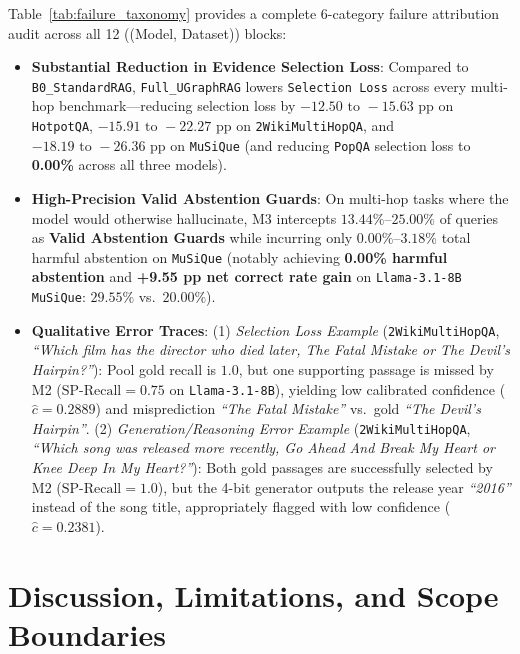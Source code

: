 \documentclass[11pt]{article}
\begin{document}
Table~\ref{tab:failure_taxonomy} provides a complete 6-category failure attribution audit across all 12 ((Model, Dataset)) blocks:
\begin{itemize}[leftmargin=*,nosep]
    \item \textbf{Substantial Reduction in Evidence Selection Loss}: Compared to \texttt{B0\_StandardRAG}, \texttt{Full\_UGraphRAG} lowers \texttt{Selection Loss} across every multi-hop benchmark---reducing selection loss by $-12.50\text{ to }-15.63\text{ pp}$ on \texttt{HotpotQA}, $-15.91\text{ to }-22.27\text{ pp}$ on \texttt{2WikiMultiHopQA}, and $-18.19\text{ to }-26.36\text{ pp}$ on \texttt{MuSiQue} (and reducing \texttt{PopQA} selection loss to \textbf{0.00\%} across all three models).
    \item \textbf{High-Precision Valid Abstention Guards}: On multi-hop tasks where the model would otherwise hallucinate, M3 intercepts $13.44\%\text{--}25.00\%$ of queries as \textbf{Valid Abstention Guards} while incurring only $0.00\%\text{--}3.18\%$ total harmful abstention on \texttt{MuSiQue} (notably achieving \textbf{0.00\% harmful abstention} and \textbf{+9.55 pp net correct rate gain} on \texttt{Llama-3.1-8B MuSiQue}: $29.55\%$ vs.\ $20.00\%$).
    \item \textbf{Qualitative Error Traces}:
    (1) \emph{Selection Loss Example} (\texttt{2WikiMultiHopQA}, \emph{``Which film has the director who died later, The Fatal Mistake or The Devil's Hairpin?''}): Pool gold recall is $1.0$, but one supporting passage is missed by M2 ($\text{SP-Recall}=0.75$ on \texttt{Llama-3.1-8B}), yielding low calibrated confidence ($\hat{c}=0.2889$) and misprediction \emph{``The Fatal Mistake''} vs.\ gold \emph{``The Devil's Hairpin''}.
    (2) \emph{Generation/Reasoning Error Example} (\texttt{2WikiMultiHopQA}, \emph{``Which song was released more recently, Go Ahead And Break My Heart or Knee Deep In My Heart?''}): Both gold passages are successfully selected by M2 ($\text{SP-Recall}=1.0$), but the 4-bit generator outputs the release year \emph{``2016''} instead of the song title, appropriately flagged with low confidence ($\hat{c}=0.2381$).
\end{itemize}

\section{Discussion, Limitations, and Scope Boundaries}
\end{document}
